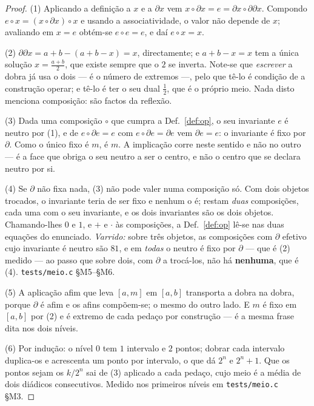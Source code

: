 \documentclass[11pt,a4paper]{article}
\newcommand{\code}[1]{\texttt{\small #1}}
\begin{document}
\begin{proof}
(1) Aplicando a definição a $x$ e a $\partial x$ vem
$x\circ\partial x=e=\partial x\circ\partial\partial x$. Compondo
$e\circ x=(x\circ\partial x)\circ x$ e usando a associatividade, o valor não
depende de $x$; avaliando em $x=e$ obtém-se $e\circ e=e$, e daí $e\circ x=x$.

(2) $\partial\partial x=a+b-(a+b-x)=x$, directamente; e $a+b-x=x$ tem a única
solução $x=\tfrac{a+b}{2}$, que existe sempre que o $2$ se inverta. Note-se que
\emph{escrever} a dobra já usa o dois --- é o número de extremos ---, pelo que
tê-lo é condição de a construção operar; e tê-lo é ter o seu dual $\tfrac12$,
que é o próprio meio. Nada disto menciona composição: são factos da reflexão.

(3) Dada uma composição $\circ$ que cumpra a Def.~\ref{def:op}, o seu invariante
$e$ é neutro por (1), e de $e\circ\partial e=e$ com $e\circ\partial e=\partial e$
vem $\partial e=e$: o invariante é fixo por $\partial$. Como o único fixo é $m$,
é $m$. A implicação corre neste sentido e não no outro --- é a face que obriga o
seu neutro a ser o centro, e não o centro que se declara neutro por si.

(4) Se $\partial$ não fixa nada, (3) não pode valer numa composição só. Com dois
objetos trocados, o invariante teria de ser fixo e nenhum o é; restam
\emph{duas} composições, cada uma com o seu invariante, e os dois invariantes
são os dois objetos. Chamando-lhes $0$ e $1$, e $+$ e $\cdot$ às composições,
a Def.~\ref{def:op} lê-se nas duas equações do enunciado. \emph{Varrido:}
sobre três objetos, as composições com $\partial$ efetivo cujo invariante é
neutro são $81$, e em \emph{todas} o neutro é fixo por $\partial$ --- que é (2)
medido --- ao passo que sobre dois, com $\partial$ a trocá-los, não há
\textbf{nenhuma}, que é (4). \code{tests/meio.c} §M5--§M6.

(5) A aplicação afim que leva $[a,m]$ em $[a,b]$ transporta a dobra na dobra,
porque $\partial$ é afim e os afins compõem-se; o mesmo do outro lado. E $m$ é
fixo em $[a,b]$ por (2) e é extremo de cada pedaço por construção --- é a mesma
frase dita nos dois níveis.

(6) Por indução: o nível $0$ tem $1$ intervalo e $2$ pontos; dobrar cada
intervalo duplica-os e acrescenta um ponto por intervalo, o que dá $2^{n}$ e
$2^{n}+1$. Que os pontos sejam os $k/2^{n}$ sai de (3) aplicado a cada pedaço,
cujo meio é a média de dois diádicos consecutivos. Medido nos primeiros níveis
em \code{tests/meio.c} §M3.
\end{proof}
\end{document}
